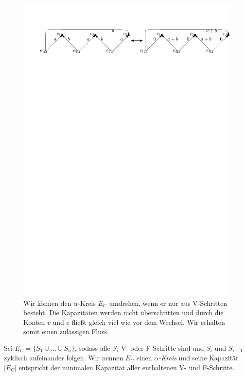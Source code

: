 \begin{figure}[h]
\centering
\includegraphics[width=1\textwidth]{K_kreis.pdf}
\caption{Wir können den $\alpha$-Kreis $E_C$ umdrehen, wenn er nur aus V-Schritten besteht. Die Kapazitäten werden nicht überschritten und durch die Konten $v$ und $e$ fließt gleich viel wie vor dem Wechsel. Wir erhalten somit einen zulässigen Fluss.}
\label{K_turn}
\end{figure}

\begin{definition}
Sei $E_C = \{S_1\cup \ldots \cup S_n\}$, sodass alle $S_i$ V- oder F-Schritte sind und $S_i$ und $S_{i+1}$ zyklisch aufeinander folgen. Wir nennen $E_C$ einen $\alpha$\textit{-Kreis} und seine Kapazität $|E_C|$ entspricht der minimalen Kapazität aller enthaltenen V- und F-Schritte.
\end{definition}


